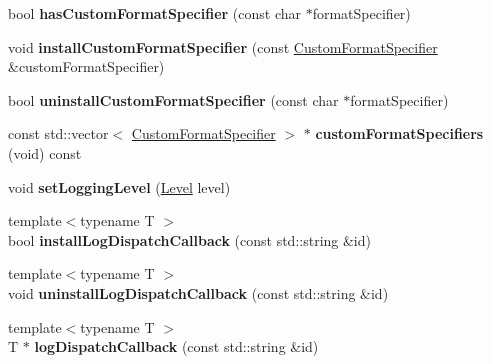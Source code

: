 \begin{DoxyCompactItemize}
bool {\bfseries has\+Custom\+Format\+Specifier} (const char $\ast$format\+Specifier)
\item 
\mbox{\label{classel_1_1base_1_1_storage_a355aac8191ab98869a52394cc868a315}} 
void {\bfseries install\+Custom\+Format\+Specifier} (const \hyperlink{classel_1_1_custom_format_specifier}{Custom\+Format\+Specifier} \&custom\+Format\+Specifier)
\item 
\mbox{\label{classel_1_1base_1_1_storage_a68e1d3e0b657418ddb0f62f60fe979d2}} 
bool {\bfseries uninstall\+Custom\+Format\+Specifier} (const char $\ast$format\+Specifier)
\item 
\mbox{\label{classel_1_1base_1_1_storage_a458a46c2621c8ec206b8127cbcc54b22}} 
const std\+::vector$<$ \hyperlink{classel_1_1_custom_format_specifier}{Custom\+Format\+Specifier} $>$ $\ast$ {\bfseries custom\+Format\+Specifiers} (void) const
\item 
\mbox{\label{classel_1_1base_1_1_storage_a163473357c32184769e8edd993c8b440}} 
void {\bfseries set\+Logging\+Level} (\hyperlink{namespaceel_ab0ac6091262344c52dd2d3ad099e8e36}{Level} level)
\item 
\mbox{\label{classel_1_1base_1_1_storage_aec36c8e770c0ac354e74d57aba1cfa03}} 
{\footnotesize template$<$typename T $>$ }\\bool {\bfseries install\+Log\+Dispatch\+Callback} (const std\+::string \&id)
\item 
\mbox{\label{classel_1_1base_1_1_storage_a34c2c9f8abff647e22e1ee0b52357f88}} 
{\footnotesize template$<$typename T $>$ }\\void {\bfseries uninstall\+Log\+Dispatch\+Callback} (const std\+::string \&id)
\item 
\mbox{\label{classel_1_1base_1_1_storage_a408d2420169a7f7286552fd153967b8d}} 
{\footnotesize template$<$typename T $>$ }\\T $\ast$ {\bfseries log\+Dispatch\+Callback} (const std\+::string \&id)
\item 
\mbox{\label{classel_1_1base_1_1_storage_ad95b77123066f0a49817155dd75583b5}} 

\end{DoxyCompactItemize}

